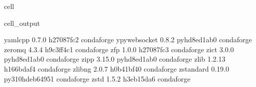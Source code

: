\documentclass[letterpaper,table,10pt,english]{jupyterBook}
\begin{document}
\begin{sphinxuseclass}{cell}
\begin{sphinxVerbatimOutput}
\begin{sphinxuseclass}{cell_output}
\begin{sphinxVerbatim}[commandchars=\\\{\}]
yaml\PYGZhy{}cpp                  0.7.0                h27087fc\PYGZus{}2    conda\PYGZhy{}forge
ypy\PYGZhy{}websocket             0.8.2              pyhd8ed1ab\PYGZus{}0    conda\PYGZhy{}forge
zeromq                    4.3.4                h9c3ff4c\PYGZus{}1    conda\PYGZhy{}forge
zfp                       1.0.0                h27087fc\PYGZus{}3    conda\PYGZhy{}forge
zict                      3.0.0              pyhd8ed1ab\PYGZus{}0    conda\PYGZhy{}forge
zipp                      3.15.0             pyhd8ed1ab\PYGZus{}0    conda\PYGZhy{}forge
zlib                      1.2.13               h166bdaf\PYGZus{}4    conda\PYGZhy{}forge
zlib\PYGZhy{}ng                   2.0.7                h0b41bf4\PYGZus{}0    conda\PYGZhy{}forge
zstandard                 0.19.0          py310hdeb6495\PYGZus{}1    conda\PYGZhy{}forge
zstd                      1.5.2                h3eb15da\PYGZus{}6    conda\PYGZhy{}forge
\end{sphinxVerbatim}

\end{sphinxuseclass}\end{sphinxVerbatimOutput}

\end{sphinxuseclass}
\end{document}
